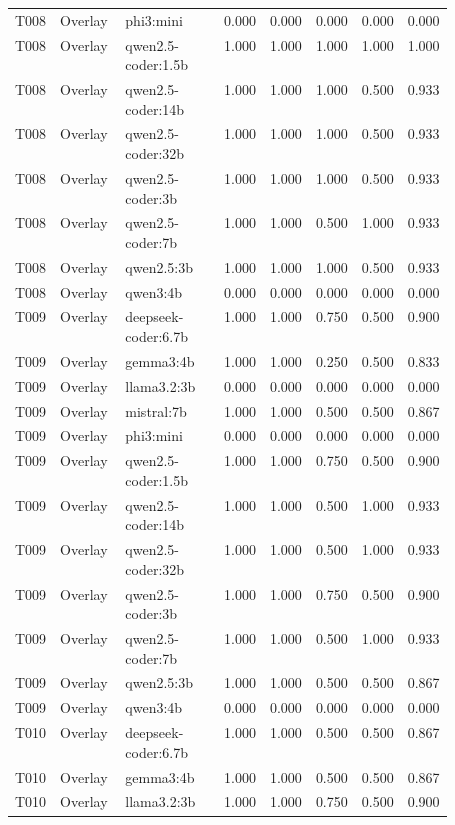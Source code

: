 \begin{longtable}{p{0.08\linewidth}p{0.16\linewidth}p{0.27\linewidth}rrrrr}
T008 & Overlay & phi3:mini & 0.000 & 0.000 & 0.000 & 0.000 & 0.000 \\
T008 & Overlay & qwen2.5-coder:1.5b & 1.000 & 1.000 & 1.000 & 1.000 & 1.000 \\
T008 & Overlay & qwen2.5-coder:14b & 1.000 & 1.000 & 1.000 & 0.500 & 0.933 \\
T008 & Overlay & qwen2.5-coder:32b & 1.000 & 1.000 & 1.000 & 0.500 & 0.933 \\
T008 & Overlay & qwen2.5-coder:3b & 1.000 & 1.000 & 1.000 & 0.500 & 0.933 \\
T008 & Overlay & qwen2.5-coder:7b & 1.000 & 1.000 & 0.500 & 1.000 & 0.933 \\
T008 & Overlay & qwen2.5:3b & 1.000 & 1.000 & 1.000 & 0.500 & 0.933 \\
T008 & Overlay & qwen3:4b & 0.000 & 0.000 & 0.000 & 0.000 & 0.000 \\
T009 & Overlay & deepseek-coder:6.7b & 1.000 & 1.000 & 0.750 & 0.500 & 0.900 \\
T009 & Overlay & gemma3:4b & 1.000 & 1.000 & 0.250 & 0.500 & 0.833 \\
T009 & Overlay & llama3.2:3b & 0.000 & 0.000 & 0.000 & 0.000 & 0.000 \\
T009 & Overlay & mistral:7b & 1.000 & 1.000 & 0.500 & 0.500 & 0.867 \\
T009 & Overlay & phi3:mini & 0.000 & 0.000 & 0.000 & 0.000 & 0.000 \\
T009 & Overlay & qwen2.5-coder:1.5b & 1.000 & 1.000 & 0.750 & 0.500 & 0.900 \\
T009 & Overlay & qwen2.5-coder:14b & 1.000 & 1.000 & 0.500 & 1.000 & 0.933 \\
T009 & Overlay & qwen2.5-coder:32b & 1.000 & 1.000 & 0.500 & 1.000 & 0.933 \\
T009 & Overlay & qwen2.5-coder:3b & 1.000 & 1.000 & 0.750 & 0.500 & 0.900 \\
T009 & Overlay & qwen2.5-coder:7b & 1.000 & 1.000 & 0.500 & 1.000 & 0.933 \\
T009 & Overlay & qwen2.5:3b & 1.000 & 1.000 & 0.500 & 0.500 & 0.867 \\
T009 & Overlay & qwen3:4b & 0.000 & 0.000 & 0.000 & 0.000 & 0.000 \\
T010 & Overlay & deepseek-coder:6.7b & 1.000 & 1.000 & 0.500 & 0.500 & 0.867 \\
T010 & Overlay & gemma3:4b & 1.000 & 1.000 & 0.500 & 0.500 & 0.867 \\
T010 & Overlay & llama3.2:3b & 1.000 & 1.000 & 0.750 & 0.500 & 0.900 \\

\end{longtable}
